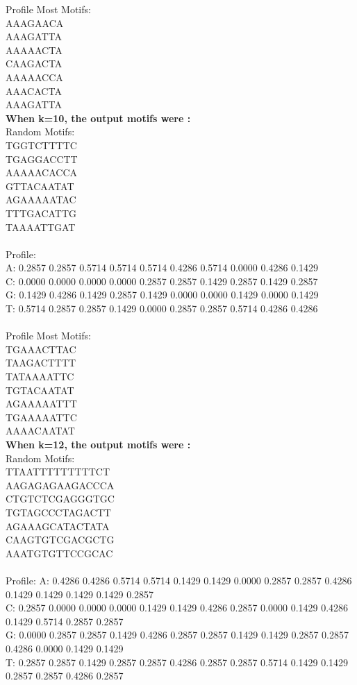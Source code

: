 \documentclass{report}
\begin{document}
Profile Most Motifs:\\
AAAGAACA\\
AAAGATTA\\
AAAAACTA\\
CAAGACTA\\
AAAAACCA\\
AAACACTA\\
AAAGATTA\\
\textbf{When k=10, the output motifs were :}\\
Random Motifs:\\
TGGTCTTTTC\\
TGAGGACCTT\\
AAAAACACCA\\
GTTACAATAT\\
AGAAAAATAC\\
TTTGACATTG\\
TAAAATTGAT\\
\\
Profile:\\
A: 0.2857 0.2857 0.5714 0.5714 0.5714 0.4286 0.5714 0.0000 0.4286 0.1429\\
C: 0.0000 0.0000 0.0000 0.0000 0.2857 0.2857 0.1429 0.2857 0.1429 0.2857\\
G: 0.1429 0.4286 0.1429 0.2857 0.1429 0.0000 0.0000 0.1429 0.0000 0.1429\\
T: 0.5714 0.2857 0.2857 0.1429 0.0000 0.2857 0.2857 0.5714 0.4286 0.4286\\
\\
Profile Most Motifs:\\
TGAAACTTAC\\
TAAGACTTTT\\
TATAAAATTC\\
TGTACAATAT\\
AGAAAAATTT\\
TGAAAAATTC\\
AAAACAATAT\\
\textbf{When k=12, the output motifs were :}\\
Random Motifs:\\
TTAATTTTTTTTTCT\\
AAGAGAGAAGACCCA\\
CTGTCTCGAGGGTGC\\
TGTAGCCCTAGACTT\\
AGAAAGCATACTATA\\
CAAGTGTCGACGCTG\\
AAATGTGTTCCGCAC\\
\\
Profile:
A: 0.4286 0.4286 0.5714 0.5714 0.1429 0.1429 0.0000 0.2857 0.2857 0.4286 0.1429 0.1429 0.1429 0.1429 0.2857\\
C: 0.2857 0.0000 0.0000 0.0000 0.1429 0.1429 0.4286 0.2857 0.0000 0.1429 0.4286 0.1429 0.5714 0.2857 0.2857\\
G: 0.0000 0.2857 0.2857 0.1429 0.4286 0.2857 0.2857 0.1429 0.1429 0.2857 0.2857 0.4286 0.0000 0.1429 0.1429\\
T: 0.2857 0.2857 0.1429 0.2857 0.2857 0.4286 0.2857 0.2857 0.5714 0.1429 0.1429 0.2857 0.2857 0.4286 0.2857\\
\end{document}
